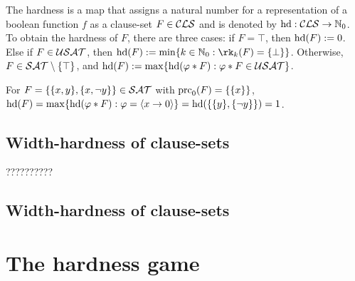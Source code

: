 \documentclass[]{book}
\begin{document}
\begin{defi}\label{def:hd-extended}
The hardness is a map that assigns a natural number for a representation of a boolean function $f$ as a clause-set $F \in \mathcal{CLS}$ and is denoted by $\operatorname{hd} : \mathcal{CLS} \rightarrow \mathbb{N}_0$. To obtain the hardness of  $F$, there are three cases: if $F = \top$, then $\operatorname{hd}(F) := 0$. Else if $F \in \mathcal{USAT}$, then $\hardness(F) := \min \set{k \in \NNZ : \rk_k(F)=\set{\bot}}$. Otherwise, $F \in \mathcal{SAT} \setminus \{ \top \}$, and $\operatorname{hd}(F) := \max \{  \operatorname{hd}(\varphi * F) : \varphi * F \in \mathcal{USAT}  \}$.
\end{defi}

\begin{examp}\label{exp:hd-extd}
For $F = \{ \{ x, y \} , \{ x,\neg y \} \} \in \mathcal{SAT}$ with $\operatorname{prc}_0(F) = \{ \{ x \} \}$,  $\operatorname{hd}(F)= \max \{  \operatorname{hd}(\varphi * F) : \varphi =\langle x \rightarrow 0 \rangle  \}=\operatorname{hd}(\{ \{ y \},\{ \neg y \} \})=1$.
\end{examp}

\section{Width-hardness of clause-sets}
\label{sec:whdd}

??????????

\section{Width-hardness of clause-sets}
\label{sec:pdg}


\chapter{The hardness game}
\label{cha:hdgame}


\newpage


\end{document}
